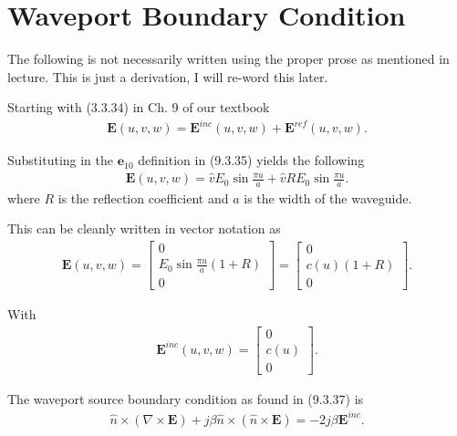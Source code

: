\section{Waveport Boundary Condition}
\label{sec:wavebc}

The following is not necessarily written using the proper prose as mentioned in lecture. This is just a derivation, I will re-word this later.

Starting with (3.3.34) in Ch. 9 of our textbook
\begin{align}
    \textbf{E}(u,v,w) = \textbf{E}^{inc}(u,v,w) + \textbf{E}^{ref}(u,v,w).
\end{align}

Substituting in the $\textbf{e}_{10}$ definition in (9.3.35) yields the following
\begin{align}
    \textbf{E}(u,v,w) = \hat{v}E_0\sin{\frac{\pi u}{a}} + \hat{v}RE_0\sin{\frac{\pi u}{a}}.
\end{align} 
where $R$ is the reflection coefficient and $a$ is the width of the waveguide.

This can be cleanly written in vector notation as
\begin{align}
    \textbf{E}(u,v,w) =\begin{bmatrix}
        0 \\
        E_0\sin{\frac{\pi u}{a}}(1+R)\\
        0
    \end{bmatrix} =\begin{bmatrix}
        0 \\
        c(u)(1+R)\\
        0
    \end{bmatrix}.
\end{align}

With 
\begin{align}
    \textbf{E}^{inc}(u,v,w) =\begin{bmatrix}
        0 \\
        c(u)\\
        0
    \end{bmatrix}.
\end{align}

The waveport source boundary condition as found in (9.3.37) is 
\begin{align}
    \hat{n}\times(\nabla\times\textbf{E})+j\beta\hat{n}\times(\hat{n}\times\textbf{E})=-2j\beta\textbf{E}^{inc}.
    \label{wavbc}
\end{align}

